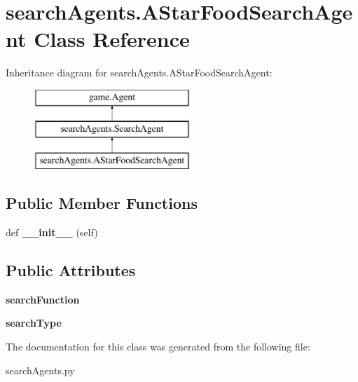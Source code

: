 \hypertarget{classsearch_agents_1_1_a_star_food_search_agent}{}\section{search\+Agents.\+A\+Star\+Food\+Search\+Agent Class Reference}
\label{classsearch_agents_1_1_a_star_food_search_agent}
Inheritance diagram for search\+Agents.\+A\+Star\+Food\+Search\+Agent\+:\begin{figure}[H]
\begin{center}
\leavevmode
\includegraphics[height=3.000000cm]{classsearch_agents_1_1_a_star_food_search_agent}
\end{center}
\end{figure}
\subsection*{Public Member Functions}
\begin{DoxyCompactItemize}
\item 
\mbox{\label{classsearch_agents_1_1_a_star_food_search_agent_a6cca432740051234c47d3a28273a8b4e}} 
def {\bfseries \+\_\+\+\_\+init\+\_\+\+\_\+} (self)
\end{DoxyCompactItemize}
\subsection*{Public Attributes}
\begin{DoxyCompactItemize}
\item 
\mbox{\label{classsearch_agents_1_1_a_star_food_search_agent_a54eeb36c41ecea572b931f8ffe93fbf0}} 
{\bfseries search\+Function}
\item 
\mbox{\label{classsearch_agents_1_1_a_star_food_search_agent_a8f93b1339dfc068a66e9f6eed2582fe2}} 
{\bfseries search\+Type}
\end{DoxyCompactItemize}


The documentation for this class was generated from the following file\+:\begin{DoxyCompactItemize}
\item 
search\+Agents.\+py\end{DoxyCompactItemize}
